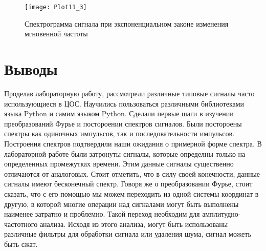 \begin{figure}[H]
	\begin{center}
		\texttt{[image: Plot11\_3]}
		\caption{Спектрограмма сигнала при экспоненциальном законе изменения мгновенной частоты} 
		\label{pic:Plot11_3} %
	\end{center}
\end{figure}


\section{Выводы}
Проделав лабораторную работу, рассмотрели различные типовые сигналы часто использующиеся в ЦОС. Научились пользоваться различными библиотеками языка Python и самим языком Python. Сделали первые шаги в изучении преобразований Фурье и постороении спектров сигналов. Были постороены спектры как одиночных импульсов, так и последовательности импульсов. Построения спектров подтвердили наши ожидания о примерной форме спектра. В лабораторной работе были затронуты сигналы, которые определны только на определенных промежутках времени. Этим данные сигналы существенно отличаются от аналоговых. Стоит отметить, что в силу своей конечности, данные сигналы имеют бесконечный спектр. Говоря же о преобразовании Фурье, стоит сказать, что с его помощью мы можем переходить из одной системы координат в другую, в которой многие операции над сигналами могут быть выполнены наименее затратно и проблемно. Такой переход необходим для амплитудно-частотного анализа. Исходя из этого анализа, могут быть использованы различные фильтры для обработки сигнала или удаления шума, сигнал можеть быть сжат.




